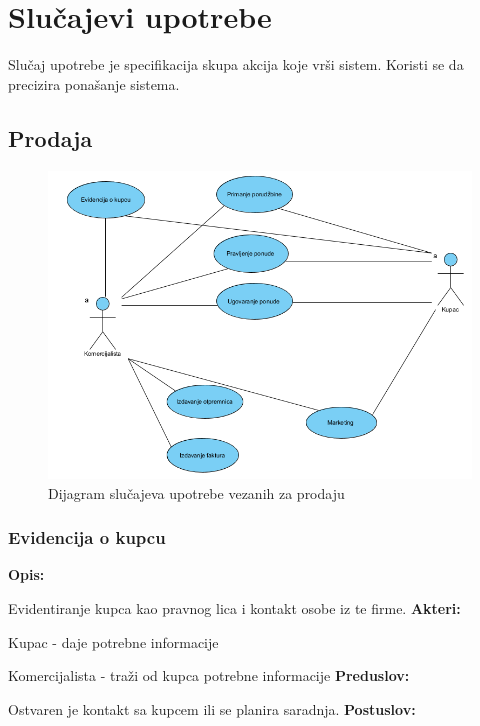 \section{Slučajevi upotrebe}

Slučaj upotrebe je specifikacija skupa akcija koje vrši sistem. Koristi se da
precizira ponašanje sistema.

\subsection{Prodaja}

\begin{figure}[ht]
\centering
\includegraphics[width=120mm]{slike/useCaseProdaja.png}%
\caption{Dijagram slučajeva upotrebe vezanih za prodaju}
\end{figure}

\clearpage

\subsubsection{Evidencija o kupcu}

\textbf{Opis:}

Evidentiranje kupca kao pravnog lica i kontakt osobe iz te firme.
\newline
\textbf{Akteri:}

Kupac - daje potrebne informacije

Komercijalista - traži od kupca potrebne informacije
\newline
\textbf{Preduslov:}

Ostvaren je kontakt sa kupcem ili se planira saradnja.
\newline
\textbf{Postuslov:}

